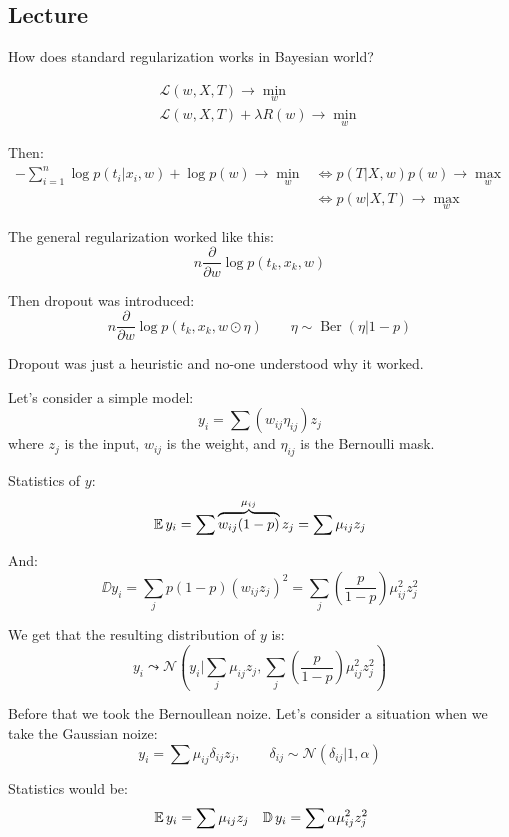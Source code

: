 \subsection{Lecture}

How does standard regularization works in Bayesian world?

\begin{gather*}
    \mathcal{L}(w, X, T) \to \min_w \\ 
    \mathcal{L}(w, X, T) + \lambda R(w) \to \min_w
\end{gather*}

Then: 
\begin{align*}
    - \sum_{i=1}^n \log p(t_i | x_i, w) + \log p(w) \to \min_w 
    &\Longleftrightarrow p (T | X, w) p(w) \to \max_w \\
    &\Longleftrightarrow p(w | X, T) \to \max_w
\end{align*}

The general regularization worked like this: 
\[ 
    n \frac{\partial}{\partial w} \log p(t_k, x_k, w)
\] 

Then dropout was introduced: 
\[ 
    n \frac{\partial}{\partial w} \log p(t_k, x_k, w \odot \eta) \qquad \eta \sim \operatorname{Ber}(\eta | 1 - p)
\] 

Dropout was just a heuristic and no-one understood why it worked. 

Let's consider a simple model:
\[ 
    y_i = \sum (w_{ij} \eta_{ij}) z_j
\] 
where $z_j$ is the input, $w_{ij}$ is the weight, and $\eta_{ij}$ is the Bernoulli mask.

Statistics of $y$: 
\[ 
    \operatorname{\mathbb{E}} y_i = \sum \overbrace{w_{ij} (1 - p)}^{\mu_{ij}} z_j = \sum \mu_{ij} z_j
\] 

And: 
\[ 
    \DD y_i = \sum_j p (1 - p) (w_{ij} z_j)^2 = \sum_j \left( \frac{p}{1 - p}\right) \mu_{ij}^2 z_j^2
\] 

We get that the resulting distribution of $y$ is: 
\[
    y_i \leadsto \mathcal{N} (y_i | \sum_j \mu_{ij} z_j, \sum_j \left( \frac{p}{1 - p}\right) \mu_{ij}^2 z_j^2)
\] 

Before that we took the Bernoullean noize. Let's consider a situation when we take the Gaussian noize:
\[ 
    y_i = \sum \mu_{ij} \delta_{ij} z_j, \qquad \delta_{ij} \sim \mathcal{N} (\delta_{ij} | 1, \alpha)
\]

Statistics would be: 
\begin{align*}
    &\operatorname{\mathbb{E}} y_i = \sum \mu_{ij} z_j
    &\operatorname{\mathbb{D}} y_i = \sum \alpha \mu_{ij}^2 z_j^2
\end{align*} 

